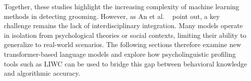 Together, these studies highlight the increasing complexity of machine learning methods in detecting grooming. However, as An et al. \ \parencite{an2025cybergrooming} point out, a key challenge remains the lack of interdisciplinary integration. Many models operate in isolation from psychological theories or social contexts, limiting their ability to generalize to real-world scenarios. The following sections therefore examine new transformer-based language models and explore how psycholinguistic profiling tools such as LIWC can be used to bridge this gap between behavioral knowledge and algorithmic accuracy.





